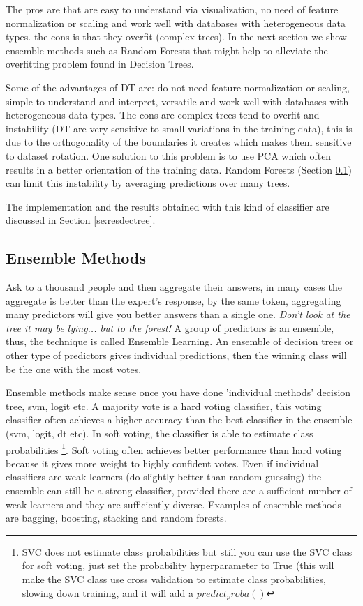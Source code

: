 \documentclass[11pt]{article}
\begin{document}
The pros are that are easy to understand via visualization, no need of feature normalization or scaling and work well with databases with heterogeneous data types. the cons is that they overfit (complex trees). In the next section we show ensemble methods such as Random Forests that might help to alleviate the overfitting problem found in Decision Trees.

Some of the advantages of DT are: do not need feature normalization or scaling, simple to understand and interpret, versatile and work well with databases with heterogeneous data types. The cons are complex trees tend to overfit and instability (DT are very sensitive to small variations in the training data), this is due to the orthogonality of the boundaries it creates which makes them sensitive to dataset rotation. One solution to this problem is to use PCA which often results in a better orientation of the training data. Random Forests (Section \ref{}) can limit this instability by averaging predictions over many trees.

The implementation and the results obtained with this kind of classifier are discussed in Section \ref{se:resdectree}.

\subsection{Ensemble Methods}

Ask to a thousand people and then aggregate their answers, in many cases the aggregate is better than the expert's response, by the same token, aggregating many predictors will give you better answers than a single one.
\emph{Don't look at the tree it may be lying... but to the forest!}
A group of predictors is an ensemble, thus, the technique is called Ensemble Learning. An ensemble of decision trees or other type of predictors gives individual predictions, then the winning class will be the one with the most votes. 

Ensemble methods make sense once you have done 'individual methods' decision tree, svm, logit etc. A majority vote is a hard voting classifier, this voting classifier often achieves a higher accuracy than the best classifier in the ensemble (svm, logit, dt etc). In soft voting, the classifier is able to estimate class probabilities \footnote{SVC does not estimate class probabilities but still you can use the SVC class for soft voting, just set the probability hyperparameter to True (this will make the SVC class use cross validation to estimate class probabilities, slowing down training, and it will add a $predict_proba()$}. Soft voting often achieves better performance than hard voting because it gives more weight to highly confident votes.
Even if individual classifiers are weak learners (do slightly better than random guessing) the ensemble can still be a strong classifier, provided there are a sufficient number of weak learners and they are sufficiently diverse. %
Examples of ensemble methods are bagging, boosting, stacking and random forests.
\end{document}
